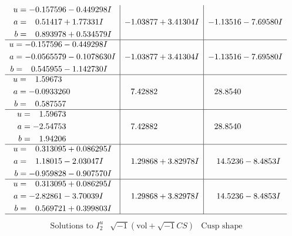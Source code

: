 \documentclass[1p]{elsarticle_modified}
\theoremstyle{definition}
\newcommand{\I}{\sqrt{-1}}
\begin{document}
$$\begin{array}{c|c|c}
\begin{aligned}
u &= -0.157596 - 0.449298 I \\
a &= \phantom{-}0.51417 + 1.77331 I \\
b &= \phantom{-}0.893978 + 0.534579 I\end{aligned}
 & -1.03877 + 3.41304 I & -1.13516 - 7.69580 I \\ \hline\begin{aligned}
u &= -0.157596 - 0.449298 I \\
a &= -0.0565579 - 0.1078630 I \\
b &= \phantom{-}0.545955 - 1.142730 I\end{aligned}
 & -1.03877 + 3.41304 I & -1.13516 - 7.69580 I \\ \hline\begin{aligned}
u &= \phantom{-}1.59673\phantom{ +0.000000I} \\
a &= -0.0933260\phantom{ +0.000000I} \\
b &= \phantom{-}0.587557\phantom{ +0.000000I}\end{aligned}
 & \phantom{-}7.42882\phantom{ +0.000000I} & \phantom{-}28.8540\phantom{ +0.000000I} \\ \hline\begin{aligned}
u &= \phantom{-}1.59673\phantom{ +0.000000I} \\
a &= -2.54753\phantom{ +0.000000I} \\
b &= \phantom{-}1.94206\phantom{ +0.000000I}\end{aligned}
 & \phantom{-}7.42882\phantom{ +0.000000I} & \phantom{-}28.8540\phantom{ +0.000000I} \\ \hline\begin{aligned}
u &= \phantom{-}0.313095 + 0.086295 I \\
a &= \phantom{-}1.18015 - 2.03047 I \\
b &= -0.959828 - 0.907570 I\end{aligned}
 & \phantom{-}1.29868 + 3.82978 I & \phantom{-}14.5236 - 8.4853 I \\ \hline\begin{aligned}
u &= \phantom{-}0.313095 + 0.086295 I \\
a &= -2.82861 - 3.70039 I \\
b &= \phantom{-}0.569721 + 0.399803 I\end{aligned}
 & \phantom{-}1.29868 + 3.82978 I & \phantom{-}14.5236 - 8.4853 I\\
 \hline 
 \end{array}$$\newpage$$\begin{array}{c|c|c}  
\text{Solutions to }I^u_{2}& \I (\text{vol} + \sqrt{-1}CS) & \text{Cusp shape}\\

\end{array}$$
\end{document}
